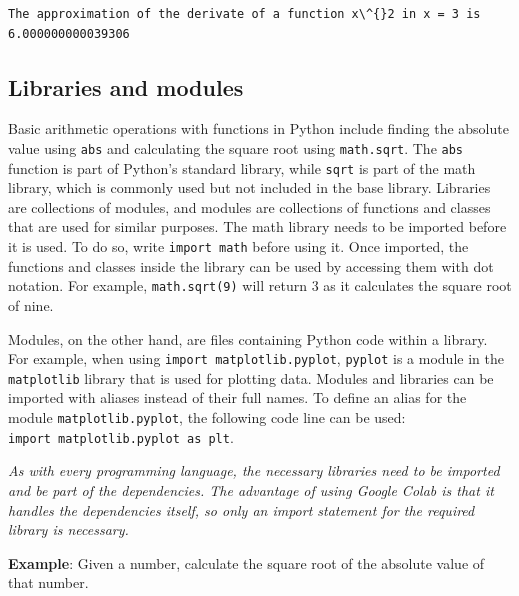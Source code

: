 \documentclass[11pt]{article}
\begin{document}
    \begin{Verbatim}[commandchars=\\\{\}]
The approximation of the derivate of a function x\^{}2 in x = 3 is
6.000000000039306
    \end{Verbatim}

    \subsection{Libraries and modules}\label{libraries-and-modules}

Basic arithmetic operations with functions in Python include finding the
absolute value using \texttt{abs} and calculating the square root using
\texttt{math.sqrt}. The \texttt{abs} function is part of Python's
standard library, while \texttt{sqrt} is part of the math library, which
is commonly used but not included in the base library. Libraries are
collections of modules, and modules are collections of functions and
classes that are used for similar purposes. The math library needs to be
imported before it is used. To do so, write \texttt{import\ math} before
using it. Once imported, the functions and classes inside the library
can be used by accessing them with dot notation. For example,
\texttt{math.sqrt(9)} will return 3 as it calculates the square root of
nine.

Modules, on the other hand, are files containing Python code within a
library. For example, when using \texttt{import\ matplotlib.pyplot},
\texttt{pyplot} is a module in the \texttt{matplotlib} library that is
used for plotting data. Modules and libraries can be imported with
aliases instead of their full names. To define an alias for the module
\texttt{matplotlib.pyplot}, the following code line can be used:
\texttt{import\ matplotlib.pyplot\ as\ plt}.

\emph{As with every programming language, the necessary libraries need
to be imported and be part of the dependencies. The advantage of using
Google Colab is that it handles the dependencies itself, so only an
import statement for the required library is necessary.} \newpage

\textbf{Example}: Given a number, calculate the square root of the
absolute value of that number.
\end{document}
